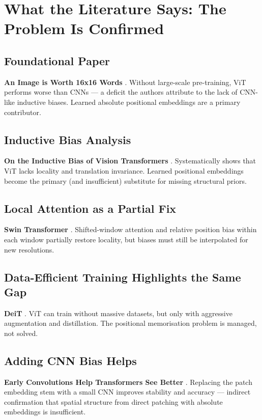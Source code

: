 \documentclass[12pt,a4paper]{article}
\begin{document}
\section{What the Literature Says: The Problem Is Confirmed}
\label{sec:literature}

\subsection{Foundational Paper}
\textbf{An Image is Worth 16x16 Words} \cite{vit2020}. Without large-scale
pre-training, ViT performs worse than CNNs --- a deficit the authors attribute
to the lack of CNN-like inductive biases. Learned absolute positional
embeddings are a primary contributor.

\subsection{Inductive Bias Analysis}
\textbf{On the Inductive Bias of Vision Transformers} \cite{park2022}.
Systematically shows that ViT lacks locality and translation invariance.
Learned positional embeddings become the primary (and insufficient) substitute
for missing structural priors.

\subsection{Local Attention as a Partial Fix}
\textbf{Swin Transformer} \cite{swin2021}. Shifted-window attention and
relative position bias within each window partially restore locality, but biases
must still be interpolated for new resolutions.

\subsection{Data-Efficient Training Highlights the Same Gap}
\textbf{DeiT} \cite{deit2021}. ViT can train without massive datasets, but only
with aggressive augmentation and distillation. The positional memorisation
problem is managed, not solved.

\subsection{Adding CNN Bias Helps}
\textbf{Early Convolutions Help Transformers See Better} \cite{xiao2021}.
Replacing the patch embedding stem with a small CNN improves stability and
accuracy --- indirect confirmation that spatial structure from direct patching
with absolute embeddings is insufficient.
\end{document}
